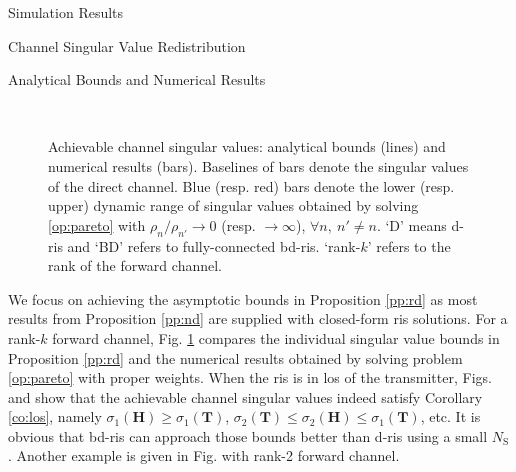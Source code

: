 \documentclass[journal]{IEEEtran}
\begin{document}
\begin{section}{Simulation Results}
\begin{subsection}{Channel Singular Value Redistribution}
		\begin{subsubsection}{Analytical Bounds and Numerical Results}
			\begin{figure}[!t]
				\centering
				\\
				\caption{
					Achievable channel singular values: analytical bounds (lines) and numerical results (bars).
					Baselines of bars denote the singular values of the direct channel.
					Blue (resp. red) bars denote the lower (resp. upper) dynamic range of singular values obtained by solving \eqref{op:pareto} with $\rho_n/\rho_{n'} \to 0$ (resp. $\to \infty$), $\forall n, \ n' \ne n$.
					`D' means \gls{d}-\gls{ris} and `BD' refers to fully-connected \gls{bd}-\gls{ris}.
					`rank-$k$' refers to the rank of the forward channel.
				}
				\label{fg:singular_bound}
			\end{figure}
			We focus on achieving the asymptotic bounds in Proposition \ref{pp:rd} as most results from Proposition \ref{pp:nd} are supplied with closed-form \gls{ris} solutions.
			For a rank-$k$ forward channel, Fig. \ref{fg:singular_bound} compares the individual singular value bounds in Proposition \ref{pp:rd} and the numerical results obtained by solving problem \eqref{op:pareto} with proper weights.
			When the \gls{ris} is in \gls{los} of the transmitter, Figs.  and  show that the achievable channel singular values indeed satisfy Corollary \ref{co:los}, namely $\sigma_1(\mathbf{H}) \ge \sigma_1(\mathbf{T})$, $\sigma_2(\mathbf{T}) \le \sigma_2(\mathbf{H}) \le \sigma_1(\mathbf{T})$, etc.
			It is obvious that \gls{bd}-\gls{ris} can approach those bounds better than \gls{d}-\gls{ris} using a small $N_\mathrm{S}$.
			Another example is given in Fig.  with rank-2 forward channel.

\end{subsubsection}
\end{subsection}
\end{section}
\end{document}
